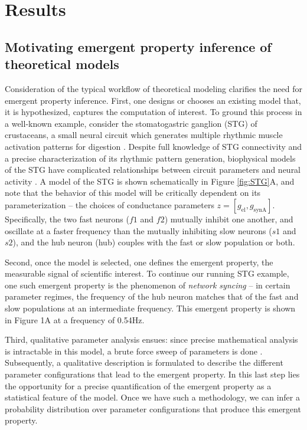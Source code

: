 \documentclass[11pt]{article}
\begin{document}

\section{Results}
\subsection{Motivating emergent property inference of theoretical models} \label{results_motivating}

Consideration of the typical workflow of theoretical modeling clarifies the need for emergent property inference.  
First, one designs or chooses an existing model that, it is hypothesized, captures the computation of interest. 
 To ground this process in a well-known example, consider the stomatogastric ganglion (STG) of crustaceans, a small neural circuit which generates multiple rhythmic muscle activation patterns for digestion \cite{marder2002cellular}.
Despite full knowledge of STG connectivity and a precise characterization of its rhythmic pattern generation, biophysical models of the STG have complicated relationships between circuit parameters and neural activity \cite{goldman2001global, prinz2004similar}.
A model of the STG \cite{gutierrez2013multiple} is shown schematically in Figure \ref{fig:STG}A, and note that the behavior of this model will be critically dependent on its parameterization -- the choices of conductance parameters $z = [g_{\text{el}}, g_{\text{synA}}]$.
Specifically, the two fast neurons ($f1$ and $f2$) mutually inhibit one another, and oscillate at a faster frequency than the mutually inhibiting slow neurons ($s1$ and $s2$), and the hub neuron (hub) couples with the fast or slow population or both.  

Second, once the model is selected, one defines the emergent property, the measurable signal of scientific interest.  
To continue our running STG example, one such emergent property is the phenomenon of \emph{network syncing} -- in certain parameter regimes, the frequency of the hub neuron matches that of the fast and slow populations at an intermediate frequency.  This emergent property is shown in Figure 1A at a frequency of 0.54Hz.

Third, qualitative parameter analysis ensues: since precise mathematical analysis is intractable in this model, a brute force sweep of parameters is done \cite{gutierrez2013multiple}.  Subsequently, a qualitative description is formulated to describe the different parameter configurations that lead to the emergent property.  
In this last step lies the opportunity for a precise quantification of the emergent property as a statistical feature of the model.  Once we have such a methodology, we can infer a probability distribution over parameter configurations that produce this emergent property. 
\end{document}
